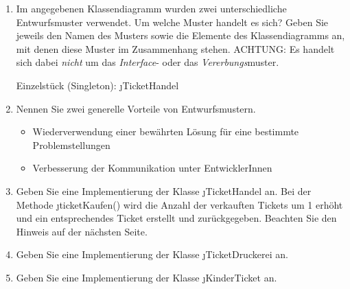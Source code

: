 \documentclass{lehramt-informatik-aufgabe}
\begin{document}
\begin{enumerate}


\item Im angegebenen Klassendiagramm wurden zwei unterschiedliche
Entwurfsmuster verwendet. Um welche Muster handelt es sich? Geben Sie
jeweils den Namen des Musters sowie die Elemente des Klassendiagramms
an, mit denen diese Muster im Zusammenhang stehen. ACHTUNG: Es handelt
sich dabei \emph{nicht} um das \emph{Interface}- oder das
\emph{Vererbungs}muster.

\begin{liAntwort}
Einzelstück (Singleton): \j{TicketHandel}
\end{liAntwort}


\item Nennen Sie zwei generelle Vorteile von Entwurfsmustern.

\begin{liAntwort}
\begin{itemize}
\item Wiederverwendung einer bewährten Lösung für eine bestimmte
Problemstellungen

\item Verbesserung der Kommunikation unter EntwicklerInnen
\end{itemize}
\end{liAntwort}


\item Geben Sie eine Implementierung der Klasse \j{TicketHandel} an. Bei
der Methode \j{ticketKaufen()} wird die Anzahl der verkauften Tickets um
1 erhöht und ein entsprechendes Ticket erstellt und zurückgegeben.
Beachten Sie den Hinweis auf der nächsten Seite.

\begin{liAntwort}
\end{liAntwort}


\item Geben Sie eine Implementierung der Klasse \j{TicketDruckerei} an.

\begin{liAntwort}
\end{liAntwort}


\item Geben Sie eine Implementierung der Klasse \j{KinderTicket} an.


\end{enumerate}
\end{document}
